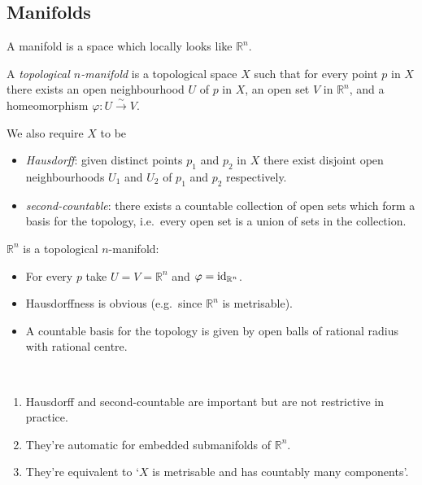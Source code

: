 \documentclass[a4paper,11pt]{article}
\begin{document}
	\subsection{Manifolds} \label{sec:1.1}
	
	A manifold is a space which locally looks like $\mathbb{R}^n$.

	\begin{defi}
		A \emph{topological $n$-manifold} is a topological space $X$ such that for every point $p$ in $X$ there exists an open neighbourhood $U$ of $p$ in $X$, an open set $V$ in $\mathbb{R}^n$, and a homeomorphism $\varphi: U \xrightarrow{\sim} V$.
		
		We also require $X$ to be 
		\begin{itemize}
			\item \emph{Hausdorff}: given distinct points $p_1$ and $p_2$ in $X$ there exist disjoint open neighbourhoods $U_1$ and $U_2$ of $p_1$ and $p_2$ respectively.
			\item \emph{second-countable}: there exists a countable collection of open sets which form a basis for the topology, i.e.\ every open set is a union of sets in the collection.
		\end{itemize}
	\end{defi}
	

	\begin{ex}
		$\mathbb{R}^n$ is a topological $n$-manifold:
		\begin{itemize}
			\item For every $p$ take $U = V = \mathbb{R}^n$ and $\varphi = \operatorname{id}_{\mathbb{R}^n}$.
			\item Hausdorffness is obvious (e.g.\ since $\mathbb{R}^n$ is metrisable).
			\item A countable basis for the topology is given by open balls of rational radius with rational centre. 
		\end{itemize}
	\end{ex}

	\begin{rmk} \ 
		\begin{enumerate}
			\item Hausdorff and second-countable are important but are not restrictive in practice.
			\item They're automatic for embedded submanifolds of $\mathbb{R}^n$.
			\item They're equivalent to `$X$ is metrisable and has countably many components'.
		\end{enumerate}
	\end{rmk}
\end{document}
